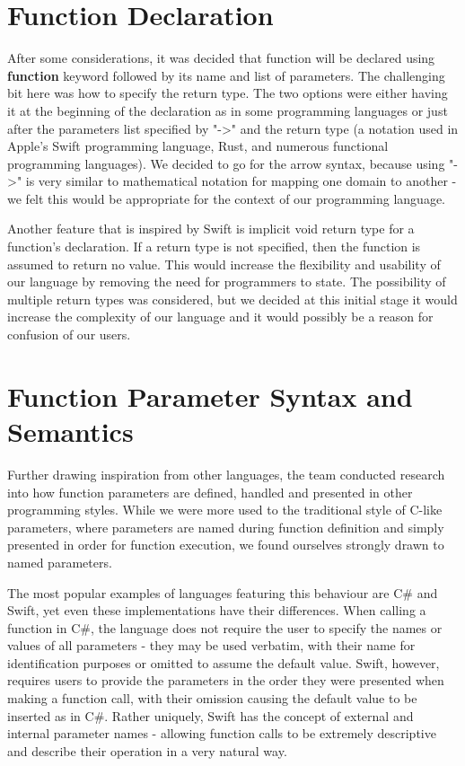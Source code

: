 \documentclass{l3proj}
\begin{document}
\section {Function Declaration}
After some considerations, it was decided that function will be declared using \textbf{function} keyword followed by its name and list of parameters. The challenging bit here was how to specify the return type. The two options were either having it at the beginning of the declaration as in some programming languages or just after the parameters list specified by "-\textgreater" and the return type (a notation used in Apple's Swift programming language, Rust, and numerous functional programming languages). We decided to go for the arrow syntax, because using "-\textgreater" is very similar to mathematical notation for mapping one domain to another - we felt this would be appropriate for the context of our programming language.

Another feature that is inspired by Swift is implicit void return type for a function's declaration. If a return type is not specified, then the function is assumed to return no value. This would increase the flexibility and usability of our language by removing the need for programmers to state.
The possibility of multiple return types was considered, but we decided at this initial stage it would increase the complexity of our language and it would possibly be a reason for confusion of our users.

\section{Function Parameter Syntax and Semantics}
Further drawing inspiration from other languages, the team conducted research into how function parameters are defined, handled and presented in other programming styles. While we were more used to the traditional style of C-like parameters, where parameters are named during function definition and simply presented in order for function execution, we found ourselves strongly drawn to named parameters.

The most popular examples of languages featuring this behaviour are C\# and Swift, yet even these implementations have their differences. When calling a function in C\#, the language does not require the user to specify the names or values of all parameters - they may be used verbatim, with their name for identification purposes or omitted to assume the default value. Swift, however, requires users to provide the parameters in the order they were presented when making a function call, with their omission causing the default value to be inserted as in C\#. Rather uniquely, Swift has the concept of external and internal parameter names - allowing function calls to be extremely descriptive and describe their operation in a very natural way.
\end{document}
